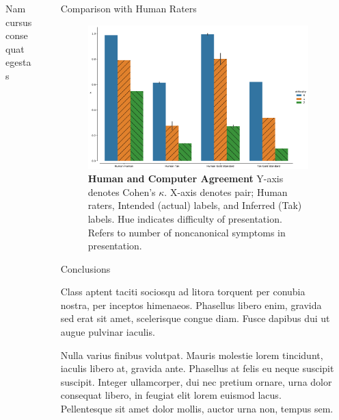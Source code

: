 \documentclass[final]{beamer}
\newlength{\sepwidth}
\newlength{\colwidth}
\newcommand{\separatorcolumn}{\begin{column}{\sepwidth}\end{column}}
\begin{document}
\begin{frame}[t]
\begin{columns}[t]
\begin{column}{\colwidth}
\begin{block}{Nam cursus consequat egestas}
  \end{block}

\end{column}

\separatorcolumn

\begin{column}{\colwidth}

  \begin{block}{Comparison with Human Raters}
     
     
     \begin{figure}
     \centering
     \includegraphics[scale=0.8]{combined-kappas.png}
     \caption{\textbf{Human and Computer Agreement} Y-axis denotes Cohen's $\kappa$. X-axis denotes pair; Human raters, Intended (actual) labels, and Inferred (Tak) labels. Hue indicates difficulty of presentation. Refers to number of noncanonical symptoms in presentation.}
     \end{figure}

  \end{block}

  \begin{block}{Conclusions}

    Class aptent taciti sociosqu ad litora torquent per conubia nostra, per
    inceptos himenaeos. Phasellus libero enim, gravida sed erat sit amet,
    scelerisque congue diam. Fusce dapibus dui ut augue pulvinar iaculis.


    Nulla varius finibus volutpat. Mauris molestie lorem tincidunt, iaculis
    libero at, gravida ante. Phasellus at felis eu neque suscipit suscipit.
    Integer ullamcorper, dui nec pretium ornare, urna dolor consequat libero,
    in feugiat elit lorem euismod lacus. Pellentesque sit amet dolor mollis,
    auctor urna non, tempus sem.

  \end{block}

\end{column}

\separatorcolumn
\end{columns}
\end{frame}
\end{document}
